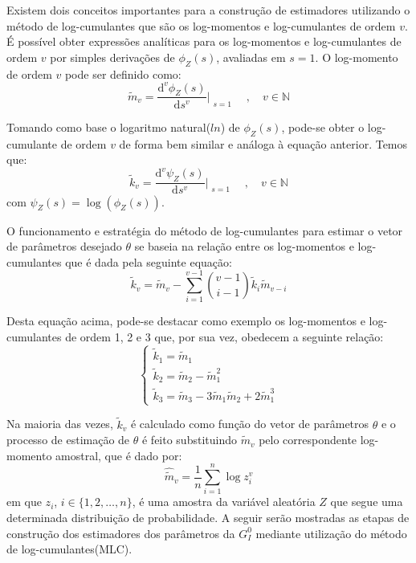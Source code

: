 \documentclass[12pt]{article}
\begin{document}
Existem dois conceitos importantes para a construção de estimadores utilizando o método de log-cumulantes que são os log-momentos e log-cumulantes de ordem $v$. É possível obter expressões analíticas para os log-momentos e log-cumulantes de ordem $v$ por simples derivações de $\phi_{Z}(s)$, avaliadas em $s = 1$. O log-momento de ordem $v$ pode ser definido como:
\begin{equation}
    \tilde{m}_{v} = \frac{\mathrm{d}^{v}\phi_{Z}(s)}{\mathrm{d}s^{v}}\Bigr|_{\substack{s=1}} \quad , \quad  v \in \mathbb{N}
    \label{eq:logmomV}
\end{equation}

Tomando como base o logaritmo natural($ln$) de $\phi_{Z}(s)$, pode-se obter o log-cumulante de ordem $v$ de forma bem similar e análoga à equação anterior. Temos que:
\begin{equation}
    \tilde{k}_{v} = \frac{\mathrm{d}^{v}\psi_Z(s)}{\mathrm{d}s^{v}}\Bigr|_{\substack{s=1}} \quad , \quad  v \in \mathbb{N}
    \label{eq:logcumV}
\end{equation}
com $\psi_Z(s) = \log(\phi_{Z}(s))$.

O funcionamento e estratégia do método de log-cumulantes para estimar o vetor de parâmetros desejado $\theta$ se baseia na relação entre os log-momentos e log-cumulantes que é dada pela seguinte equação:
\begin{equation}
    \tilde{k}_{v} = \tilde{m}_{v} - \sum_{i=1}^{v-1}\binom{v-1}{i-1}\tilde{k}_{i}\tilde{m}_{v-i}
\end{equation}

Desta equação acima, pode-se destacar como exemplo os log-momentos e log-cumulantes de ordem 1, 2 e 3 que, por sua vez, obedecem a seguinte relação:
\begin{equation}
    \left\{\begin{matrix}
        \tilde{k}_{1} = \tilde{m}_{1} \\ 
        \tilde{k}_{2} = \tilde{m}_{2} - \tilde{m}_{1}^{2} \\
        \tilde{k}_{3} = \tilde{m}_{3} - 3\tilde{m}_{1}\tilde{m}_{2} + 2\tilde{m}_{1}^{3} 
    \end{matrix}\right.
    \label{eq:logcum123}
\end{equation}

Na maioria das vezes, $\tilde{k}_{v}$ é calculado como função do vetor de parâmetros $\theta$ e o processo de estimação de $\theta$ é feito substituindo $\tilde{m}_{v}$ pelo correspondente log-momento amostral, que é dado por:
\begin{equation}
    \widehat{\tilde{m}}_{v} = \frac{1}{n}\sum_{i=1}^{n}\log z_{i}^{v}
    \label{eq:log_momAmostrais}
\end{equation}
em que $z_i$, $i \in \{1, 2, \dots, n\}$, é uma amostra da variável aleatória $Z$ que segue uma determinada distribuição de probabilidade. A seguir serão mostradas as etapas de construção dos estimadores dos parâmetros da $G_I^0$ mediante utilização do método de log-cumulantes(MLC). 
\end{document}
